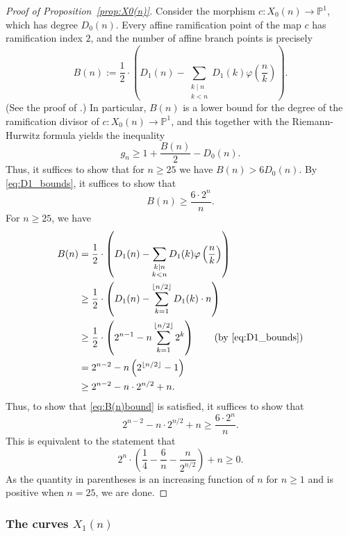 \documentclass[12pt]{amsart}
\theoremstyle{definition}
\newcommand{\bbP}{\mathbb{P}}
\renewcommand{\phi}{\varphi}
\numberwithin{equation}{section}
\begin{document}
\begin{proof}[Proof of Proposition~\ref{prop:X0(n)}]
Consider the morphism $c : X_0(n) \to \bbP^1$, which has degree $D_0(n)$. Every affine ramification point of the map $c$ has ramification index $2$, and the number of affine branch points is precisely
    \[
        B(n) := \frac12\cdot \left(D_1(n) - \sum_{\substack{k\mid n\\k < n}} D_1(k)\phi\left(\frac nk\right)\right).
    \]
(See the proof of \cite[Theorem 13]{morton:1996}.) In particular, $B(n)$ is a lower bound for the degree of the ramification divisor of $c : X_0(n) \to \bbP^1$, and this together with the Riemann-Hurwitz formula yields the inequality
    \begin{equation}\label{eq:genus_ineq}
        g_n \ge 1 + \frac{B(n)}2 - D_0(n).
    \end{equation}
Thus, it suffices to show that for $n \ge 25$ we have $B(n) > 6D_0(n)$. By \eqref{eq:D1_bounds}, it suffices to show that
    \begin{equation}\label{eq:B(n)bound}
        B(n) \ge \frac{6 \cdot 2^n}n.
    \end{equation}
For $n \ge 25$, we have
    \begin{align*}
        B(n)
            &= \frac12\cdot \left(D_1(n) - \sum_{\substack{k\mid n\\k < n}} D_1(k)\phi\left(\frac nk\right)\right)\\
            &\ge \frac12\cdot\left(D_1(n) - \sum_{k=1}^{\lfloor n/2\rfloor} D_1(k)\cdot n\right)\\
            &\ge \frac12\cdot\left(2^{n-1} - n\sum_{k=1}^{\lfloor n/2\rfloor} 2^k\right) \qquad\text{(by \eqref{eq:D1_bounds})}\\
            &= 2^{n-2} - n\left(2^{\lfloor n/2\rfloor} - 1\right)\\
            &\ge 2^{n-2} - n\cdot 2^{n/2} + n.
    \end{align*}
Thus, to show that \eqref{eq:B(n)bound} is satisfied, it suffices to show that
    \[ 
        2^{n-2} - n\cdot 2^{n/2} + n \ge \frac{6 \cdot 2^n}n.
    \]
This is equivalent to the statement that
    \[
    2^n \cdot \left(\frac14 - \frac6n - \frac n{2^{n/2}}\right) + n \ge 0.
    \]
As the quantity in parentheses is an increasing function of $n$ for $n \ge 1$ and is positive when $n = 25$, we are done.
\end{proof}

\subsubsection{The curves $X_1(n)$}
\end{document}
